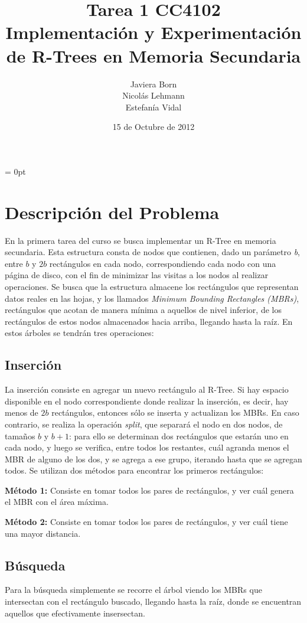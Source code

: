 \documentclass[12pt,spanish]{article}
\title{Tarea 1 CC4102 \\ Implementaci\'on y Experimentaci\'on de R-Trees en Memoria Secundaria}
\author{Javiera Born\\ Nicol\'as Lehmann \\ Estefan\'ia Vidal}
\date{15 de Octubre de 2012}
\begin{document}
\vspace{-1cm}
\hoffset = 0pt
\maketitle
\section{Descripci\'on del Problema}
	En la primera tarea del curso se busca implementar un R-Tree en memoria secundaria. Esta estructura consta de nodos que contienen, dado un par\'ametro \emph{b}, entre $b$ y $2b$ rect\'angulos en cada nodo, correspondiendo cada nodo con una p\'agina de disco, con el fin de minimizar las visitas a los nodos al realizar operaciones. Se busca que la estructura almacene los rect\'angulos que representan datos reales en las hojas, y los llamados \emph{Minimum Bounding Rectangles (MBRs)}, rect\'angulos que acotan de manera m\'inima a aquellos de nivel inferior, de los rect\'angulos de estos nodos almacenados hacia arriba, llegando hasta la ra\'iz. En estos \'arboles se tendr\'an tres operaciones:
	
\subsection{Inserci\'on}
	La inserci\'on consiste en agregar un nuevo rect\'angulo al R-Tree. Si hay espacio disponible en el nodo correspondiente donde realizar la inserci\'on, es decir, hay menos de $2b$ rect\'angulos, entonces s\'olo se inserta y actualizan los MBRs. En caso contrario, se realiza la operaci\'on \emph{split}, que separar\'a el nodo en dos nodos, de tama\~nos $b$ y $b+1$: para ello se determinan dos rect\'angulos que estar\'an uno en cada nodo, y luego se verifica, entre todos los restantes, cu\'al agranda menos el MBR de alguno de los dos, y se agrega a ese grupo, iterando hasta que se agregan todos. Se utilizan dos m\'etodos para encontrar los primeros rect\'angulos:

\textbf{M\'etodo 1:} Consiste en tomar todos los pares de rect\'angulos, y ver cu\'al genera el MBR con el \'area m\'axima.

\textbf{M\'etodo 2:} Consiste en tomar todos los pares de rect\'angulos, y ver cu\'al tiene una mayor distancia.

\subsection{B\'usqueda}
	Para la b\'usqueda simplemente se recorre el \'arbol viendo los MBRs que intersectan con el rect\'angulo buscado, llegando hasta la ra\'iz, donde se encuentran aquellos que efectivamente insersectan.
	
\end{document}
